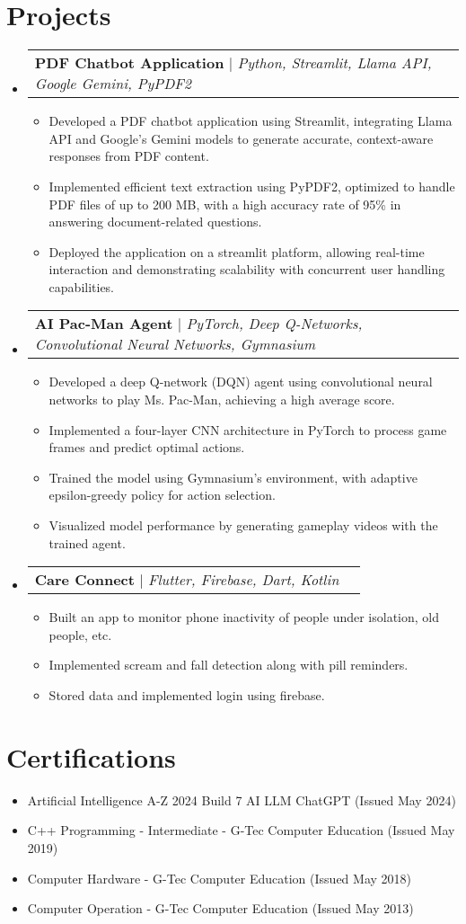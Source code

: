 \documentclass[letterpaper,11pt]{article}
\makeatletter
\newcommand{\resumeItem}[1]{
  \item\small{
    {#1 \vspace{-2pt}}
  }
}
\newcommand{\resumeProjectHeading}[2]{
    \item
    \begin{tabular*}{0.97\textwidth}{l@{\extracolsep{\fill}}r}
      \small#1 & #2 \\
    \end{tabular*}\vspace{-7pt}
}
\newcommand{\resumeSubHeadingListStart}{\begin{itemize}[leftmargin=0.15in, label={}]}
\newcommand{\resumeSubHeadingListEnd}{\end{itemize}}
\newcommand{\resumeItemListStart}{\begin{itemize}}
\newcommand{\resumeItemListEnd}{\end{itemize}\vspace{-5pt}}
\makeatother
\begin{document}
\section{Projects}
    \resumeSubHeadingListStart
      \resumeProjectHeading
          {\textbf{PDF Chatbot Application} $|$ \emph{Python, Streamlit, Llama API, Google Gemini, PyPDF2}}{}
          \resumeItemListStart
            \resumeItem{Developed a PDF chatbot application using Streamlit, integrating Llama API and Google’s Gemini models to generate accurate, context-aware responses from PDF content.}
            \resumeItem{Implemented efficient text extraction using PyPDF2, optimized to handle PDF files of up to 200 MB, with a high accuracy rate of 95\% in answering document-related questions.}
            \resumeItem{Deployed the application on a streamlit platform, allowing real-time interaction and demonstrating scalability with concurrent user handling capabilities.}
          \resumeItemListEnd
      \resumeProjectHeading
          {\textbf{AI Pac-Man Agent} $|$ \emph{PyTorch, Deep Q-Networks, Convolutional Neural Networks, Gymnasium}}{}
    \resumeItemListStart
        \resumeItem{Developed a deep Q-network (DQN) agent using convolutional neural networks to play Ms. Pac-Man, achieving a high average score.}
        \resumeItem{Implemented a four-layer CNN architecture in PyTorch to process game frames and predict optimal actions.}
        \resumeItem{Trained the model using Gymnasium's environment, with adaptive epsilon-greedy policy for action selection.}
        \resumeItem{Visualized model performance by generating gameplay videos with the trained agent.}
          \resumeItemListEnd
      \resumeProjectHeading
          {\textbf{Care Connect} $|$ \emph{Flutter, Firebase, Dart, Kotlin}}{}
          \resumeItemListStart
            \resumeItem{Built an app to monitor phone inactivity of people under isolation, old people, etc.}
            \resumeItem{Implemented scream and fall detection along with pill reminders.}
            \resumeItem{Stored data and implemented login using firebase.}
          \resumeItemListEnd
    \resumeSubHeadingListEnd

\section{Certifications}
  \resumeSubHeadingListStart
    \resumeItemListStart
      \resumeItem{Artificial Intelligence A-Z 2024 Build 7 AI LLM ChatGPT (Issued May 2024)}
      \resumeItem{C++ Programming - Intermediate - G-Tec Computer Education (Issued May 2019)}
      \resumeItem{Computer Hardware - G-Tec Computer Education (Issued May 2018)}
      \resumeItem{Computer Operation - G-Tec Computer Education (Issued May 2013)}
    \resumeItemListEnd
  \resumeSubHeadingListEnd
\end{document}
